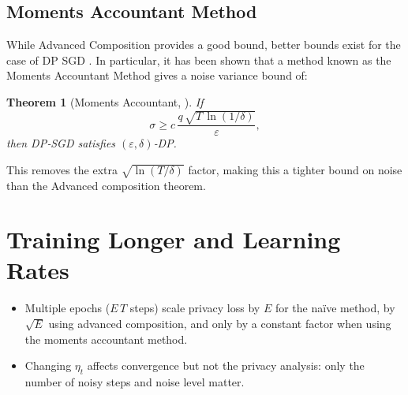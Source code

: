\documentclass{article}
\newtheorem{theorem}{Theorem}
\begin{document}
\subsection{Moments Accountant Method}
While Advanced Composition provides a good bound, better bounds exist for the case of DP SGD \cite{AAH16}. In particular, it has been shown that a method known as the Moments Accountant Method gives a noise variance bound of:

\begin{theorem}[Moments Accountant, {\cite[Thm.~1]{AAH16}}]
If 
\[
\sigma \ge c\,\frac{q\,\sqrt{T\,\ln(1/\delta)}}{\varepsilon},
\]
then DP‑SGD satisfies $(\varepsilon,\delta)$‑DP.
\end{theorem}

This removes the extra $\sqrt{\ln(T/\delta)}$ factor, making this a tighter bound on noise than the Advanced composition theorem.

\section{Training Longer and Learning Rates}
\begin{itemize}
  \item Multiple epochs ($E\,T$ steps) scale privacy loss by $E$ for the naïve method, by $\sqrt{E}$ using advanced composition, and only by a constant factor when using the moments accountant method.
  \item Changing $\eta_t$ affects convergence but not the privacy analysis: only the number of noisy steps and noise level matter.
\end{itemize}



\end{document}

